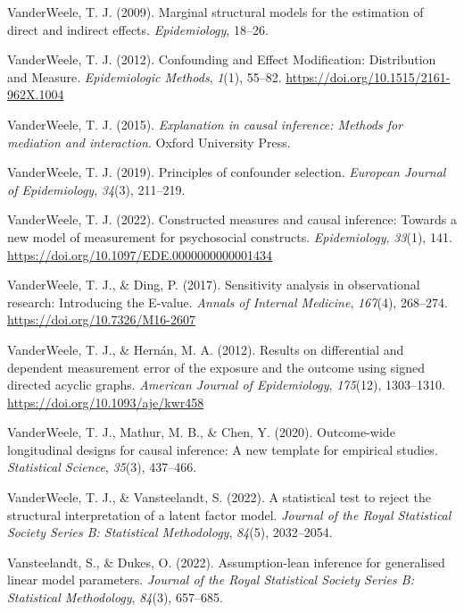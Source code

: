 \documentclass[
  single column]{article}
\newlength{\cslhangindent}
\newenvironment{CSLReferences}[2] %
 {\begin{list}{}{%
  \setlength{\itemindent}{0pt}
  \setlength{\leftmargin}{0pt}
  \setlength{\parsep}{0pt}
  \ifodd #1
   \setlength{\leftmargin}{\cslhangindent}
   \setlength{\itemindent}{-1\cslhangindent}
  \fi
  \setlength{\itemsep}{#2\baselineskip}}}
 {\end{list}}
\begin{document}
\begin{CSLReferences}{1}{0}
VanderWeele, T. J. (2009). Marginal structural models for the estimation
of direct and indirect effects. \emph{Epidemiology}, 18--26.

VanderWeele, T. J. (2012). Confounding and Effect Modification:
Distribution and Measure. \emph{Epidemiologic Methods}, \emph{1}(1),
55--82. \url{https://doi.org/10.1515/2161-962X.1004}

VanderWeele, T. J. (2015). \emph{Explanation in causal inference:
Methods for mediation and interaction}. Oxford University Press.

VanderWeele, T. J. (2019). Principles of confounder selection.
\emph{European Journal of Epidemiology}, \emph{34}(3), 211--219.

VanderWeele, T. J. (2022). Constructed measures and causal inference:
Towards a new model of measurement for psychosocial constructs.
\emph{Epidemiology}, \emph{33}(1), 141.
\url{https://doi.org/10.1097/EDE.0000000000001434}

VanderWeele, T. J., \& Ding, P. (2017). Sensitivity analysis in
observational research: Introducing the {E}-value. \emph{Annals of
Internal Medicine}, \emph{167}(4), 268--274.
\url{https://doi.org/10.7326/M16-2607}

VanderWeele, T. J., \& Hernán, M. A. (2012). Results on differential and
dependent measurement error of the exposure and the outcome using signed
directed acyclic graphs. \emph{American Journal of Epidemiology},
\emph{175}(12), 1303--1310. \url{https://doi.org/10.1093/aje/kwr458}

VanderWeele, T. J., Mathur, M. B., \& Chen, Y. (2020). Outcome-wide
longitudinal designs for causal inference: A new template for empirical
studies. \emph{Statistical Science}, \emph{35}(3), 437--466.

VanderWeele, T. J., \& Vansteelandt, S. (2022). A statistical test to
reject the structural interpretation of a latent factor model.
\emph{Journal of the Royal Statistical Society Series B: Statistical
Methodology}, \emph{84}(5), 2032--2054.

Vansteelandt, S., \& Dukes, O. (2022). Assumption-lean inference for
generalised linear model parameters. \emph{Journal of the Royal
Statistical Society Series B: Statistical Methodology}, \emph{84}(3),
657--685.


\end{CSLReferences}
\end{document}
